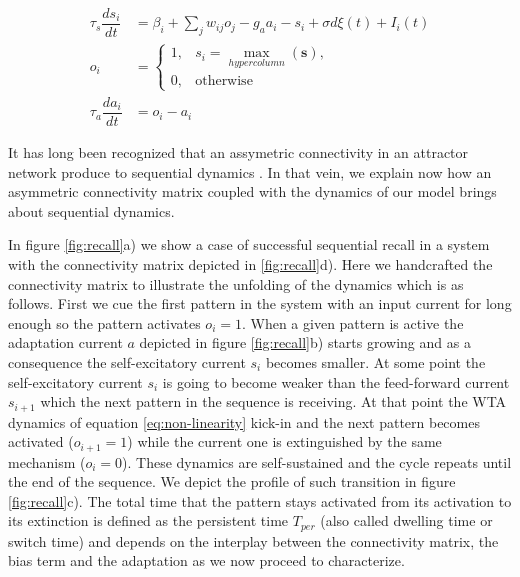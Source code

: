 \documentclass[10pt,a4paper]{article}
\begin{document}
\begin{align}
\tau_s \dfrac{ds_i}{dt} &= \beta_i + \sum_{j} w_{ij} o_j  - g_a a_i - s_i  + \sigma d\xi(t) + I_i(t) \label{eq:current} \\ o_i &=   \begin{cases}
       1,&  s_i = \underset{hypercolumn}{\max}(\mathbf{s}),\\
       0 ,& \text{otherwise}
    \end{cases} \label{eq:non-linearity} \\
\tau_a \dfrac{da_i}{dt} &= o_i - a_i \label{eq:adaptation} 
\end{align}


It has long been recognized that an assymetric connectivity in an attractor network produce to sequential dynamics \cite{amit1992modeling}. In that vein, we explain now how an asymmetric connectivity matrix coupled with the dynamics of our model brings about sequential dynamics. 
 
In figure \ref{fig:recall}a) we show a case of successful sequential recall in a system with the connectivity matrix depicted in \ref{fig:recall}d). Here we handcrafted the connectivity matrix to illustrate the unfolding of the dynamics which is as follows. First we cue the first pattern in the system with an input current for long enough so the pattern activates $o_i=1$. When a given pattern is active the adaptation current $a$ depicted in figure \ref{fig:recall}b) starts growing and as a consequence the self-excitatory current $s_i$ becomes smaller. At some point the self-excitatory current $s_i$ is going to become weaker than the feed-forward current $s_{i + 1}$  which the next pattern in the sequence is receiving. At that point the WTA dynamics of equation \ref{eq:non-linearity} kick-in and the next pattern becomes activated ($o_{i + 1}=1$) while the current one is extinguished by the same mechanism ($o_{i} =0$). These dynamics are self-sustained and the cycle repeats until the end of the sequence. We depict the profile of such transition in figure \ref{fig:recall}c). The total time that the pattern stays activated from its activation to its extinction is defined as the persistent time $T_{per}$ (also called dwelling time or switch time) and depends on the interplay between the connectivity matrix, the bias term and the adaptation as we now proceed to characterize.
\end{document}
